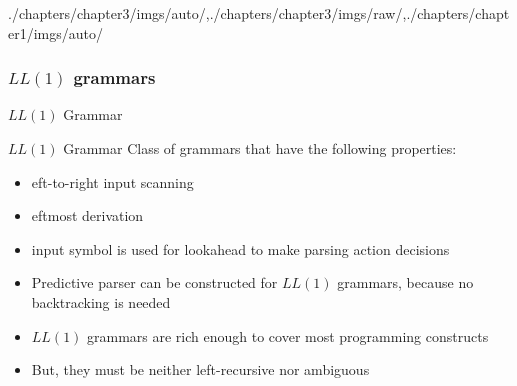 \begin{graphicspathcontext}{{./chapters/chapter3/imgs/auto/},{./chapters/chapter3/imgs/raw/},{./chapters/chapter1/imgs/auto/}}
\begin{bibunit}[apalike]
\subsubsection{$LL(1)$ grammars}
\subsubsectiontableofcontentslide

\begin{frame}{$LL(1)$ Grammar}
	\begin{definitionblock}{$LL(1)$ Grammar}
		Class of grammars that have the following properties:
		\begin{itemize}
			\item {\Large{}}eft-to-right input scanning
			\item {\Large{}}eftmost derivation
			\item {\Large{}} input symbol is used for lookahead to make parsing action decisions
		\end{itemize}
	\end{definitionblock}
	\begin{itemize}
	\item Predictive parser can be constructed for $LL(1)$ grammars, because no backtracking is needed
	\vfill
	\item $LL(1)$ grammars are rich enough to cover most programming constructs
	\item But, they must be neither left-recursive nor ambiguous
	\end{itemize}
\end{frame}


\end{bibunit}
\end{graphicspathcontext}
